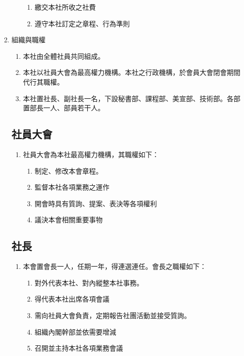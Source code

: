 \documentclass[10pt, a4paper]{cos}
\begin{document}
\begin{enumerate}
\begin{enumerate}
\begin{enumerate}
\item 繳交本社所收之社費
\item 遵守本社訂定之章程、行為準則
\end{enumerate}
\end{enumerate}
\item 組織與職權
\begin{enumerate}
\item 本社由全體社員共同組成。
\item 本社以社員大會為最高權力機構。本社之行政機構，於會員大會閉會期間代行其職權。
\item 本社置社長、副社長一名，下設秘書部、課程部、美宣部、技術部。各部置部長一人、部員若干人。
\end{enumerate}
\subsection{社員大會}
\begin{enumerate}
\item 社員大會為本社最高權力機構，其職權如下：
\begin{enumerate}
\item 制定、修改本會章程。 
\item 監督本社各項業務之運作
\item 開會時具有質詢、提案、表決等各項權利
\item 議決本會相關重要事物
\end{enumerate}
\end{enumerate}
\subsection{社長}
\begin{enumerate}
\item 本會置會長一人，任期一年，得連選連任。會長之職權如下：
\begin{enumerate}
\item 對外代表本社、對內縱整本社事務。
\item 得代表本社出席各項會議
\item 需向社員大會負責，定期報告社團活動並接受質詢。
\item 組織內閣幹部並依需要增減
\item 召開並主持本社各項業務會議
\end{enumerate}
\end{enumerate}
\end{enumerate}
\end{document}
